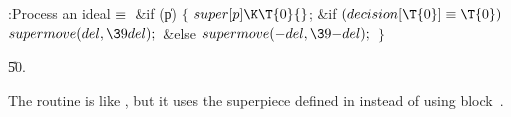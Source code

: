 \B{}:Process an ideal\X${}\equiv{}$\6
\&{if} (\|p)\5
${}\{{}$\1\6
${}\\{super}[\|p]\K\T{0}{}$;\6
\&{if} ${}(\\{decision}[\T{0}]\E\T{0}){}$\1\5
${}\\{supermove}(\\{del},\39\\{del});{}$\2\6
\&{else}\1\5
${}\\{supermove}({-}\\{del},\39{-}\\{del});{}$\2\6
\4${}\}{}$\2\par
\U50.\fi

The  routine is like , but it uses the
superpiece
defined in  instead of using block~.

